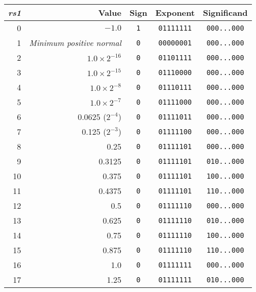 \begin{table}[h!]
\center
\begin{tabular}{|r|r|c|c|c|}
\hline
{\em rs1}   & Value                            & Sign    & Exponent       & Significand     \\
\hline
 0          & $-1.0$                           & {\tt 1} & {\tt 01111111} & {\tt 000...000} \\
 1          & {\em Minimum positive normal}    & {\tt 0} & {\tt 00000001} & {\tt 000...000} \\
 2          & $1.0 \times 2^{-16}$             & {\tt 0} & {\tt 01101111} & {\tt 000...000} \\
 3          & $1.0 \times 2^{-15}$             & {\tt 0} & {\tt 01110000} & {\tt 000...000} \\
 4          & $1.0 \times 2^{-8}$              & {\tt 0} & {\tt 01110111} & {\tt 000...000} \\
 5          & $1.0 \times 2^{-7}$              & {\tt 0} & {\tt 01111000} & {\tt 000...000} \\
 6          & 0.0625 ($2^{-4}$)                & {\tt 0} & {\tt 01111011} & {\tt 000...000} \\
 7          & 0.125 ($2^{-3}$)                 & {\tt 0} & {\tt 01111100} & {\tt 000...000} \\
 8          & 0.25                             & {\tt 0} & {\tt 01111101} & {\tt 000...000} \\
 9          & 0.3125                           & {\tt 0} & {\tt 01111101} & {\tt 010...000} \\
10          & 0.375                            & {\tt 0} & {\tt 01111101} & {\tt 100...000} \\
11          & 0.4375                           & {\tt 0} & {\tt 01111101} & {\tt 110...000} \\
12          & 0.5                              & {\tt 0} & {\tt 01111110} & {\tt 000...000} \\
13          & 0.625                            & {\tt 0} & {\tt 01111110} & {\tt 010...000} \\
14          & 0.75                             & {\tt 0} & {\tt 01111110} & {\tt 100...000} \\
15          & 0.875                            & {\tt 0} & {\tt 01111110} & {\tt 110...000} \\
16          & 1.0                              & {\tt 0} & {\tt 01111111} & {\tt 000...000} \\
17          & 1.25                             & {\tt 0} & {\tt 01111111} & {\tt 010...000} \\

\end{tabular}
\end{table}
